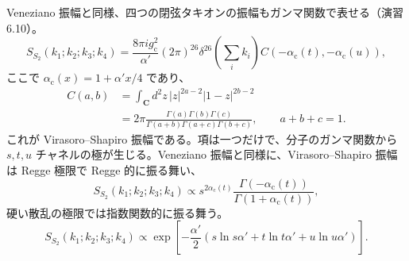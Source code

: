 Veneziano 振幅と同様、四つの閉弦タキオンの振幅もガンマ関数で表せる（演習6.10）。
\begin{equation}
S_{S_2}(k_1;k_2;k_3;k_4)
=\frac{8\pi ig_{\mathrm c}^2}{\alpha'}(2\pi)^{26}
\delta^{26}\left(\sum_i k_i\right)
C(-\alpha_{\mathrm c}(t),-\alpha_{\mathrm c}(u)),
\tag{6.6.10}\label{eq:6.6.10}
\end{equation}
ここで $\alpha_{\mathrm c}(x)=1+\alpha'x/4$ であり、
\begin{equation}
\begin{aligned}
C(a,b)&=\int_{\mathbf C}d^2z\,|z|^{2a-2}|1-z|^{2b-2}\\
&=2\pi\frac{\Gamma(a)\Gamma(b)\Gamma(c)}
{\Gamma(a+b)\Gamma(a+c)\Gamma(b+c)},
\qquad a+b+c=1.
\end{aligned}
\tag{6.6.11}\label{eq:6.6.11}
\end{equation}
これが Virasoro--Shapiro 振幅である。項は一つだけで、分子のガンマ関数から $s,t,u$ チャネルの極が生じる。Veneziano 振幅と同様に、Virasoro--Shapiro 振幅は Regge 極限で Regge 的に振る舞い、
\begin{equation}
S_{S_2}(k_1;k_2;k_3;k_4)
\propto s^{2\alpha_{\mathrm c}(t)}
\frac{\Gamma(-\alpha_{\mathrm c}(t))}
{\Gamma(1+\alpha_{\mathrm c}(t))},
\tag{6.6.12}\label{eq:6.6.12}
\end{equation}
硬い散乱の極限では指数関数的に振る舞う。
\begin{equation}
S_{S_2}(k_1;k_2;k_3;k_4)
\propto\exp\left[-\frac{\alpha'}2
(s\ln s\alpha'+t\ln t\alpha'+u\ln u\alpha')\right].
\tag{6.6.13}\label{eq:6.6.13}
\end{equation}

